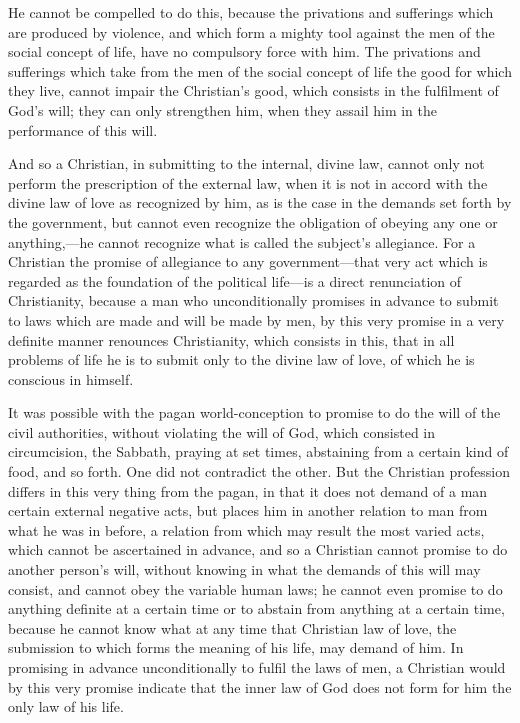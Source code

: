 \documentclass{book}
\begin{document}
He cannot be compelled to do this, because the privations and sufferings which are produced by violence, and which form a mighty tool against the men of the social concept of life, have no compulsory force with him. The privations and sufferings which take from the men of the social concept of life the good for which they live, cannot impair the Christian’s good, which consists in the fulfilment of God’s will; they can only strengthen him, when they assail him in the performance of this will.

And so a Christian, in submitting to the internal, divine law, cannot only not perform the prescription of the external law, when it is not in accord with the divine law of love as recognized by him, as is the case in the demands set forth by the government, but cannot even recognize the obligation of obeying any one or anything,—he cannot recognize what is called the subject’s allegiance. For a Christian the promise of allegiance to any government—that very act which is regarded as the foundation of the political life—is a direct renunciation of Christianity, because a man who unconditionally promises in advance to submit to laws which are made and will be made by men, by this very promise in a very definite manner renounces Christianity, which consists in this, that in all problems of life he is to submit only to the divine law of love, of which he is conscious in himself.

It was possible with the pagan world-conception to promise to do the will of the civil authorities, without violating the will of God, which consisted in circumcision, the Sabbath, praying at set times, abstaining from a certain kind of food, and so forth. One did not contradict the other. But the Christian profession differs in this very thing from the pagan, in that it does not demand of a man certain external negative acts, but places him in another relation to man from what he was in before, a relation from which may result the most varied acts, which cannot be ascertained in advance, and so a Christian cannot promise to do another person’s will, without knowing in what the demands of this will may consist, and cannot obey the variable human laws; he cannot even promise to do anything definite at a certain time or to abstain from anything at a certain time, because he cannot know what at any time that Christian law of love, the submission to which forms the meaning of his life, may demand of him. In promising in advance unconditionally to fulfil the laws of men, a Christian would by this very promise indicate that the inner law of God does not form for him the only law of his life.
\end{document}
